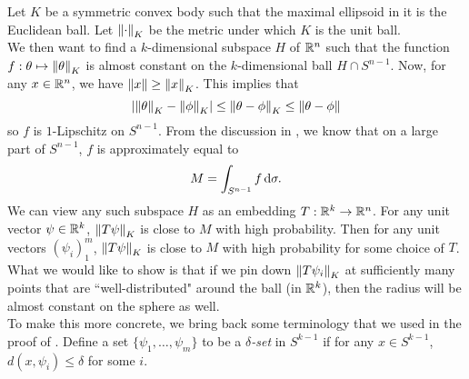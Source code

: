 Let $K$ be a symmetric convex body such that the maximal ellipsoid in it is the Euclidean ball. Let $\left\lVert\cdot\right\rVert_K$ be the metric under which $K$ is the unit ball.\\
We then want to find a $k$-dimensional subspace $H$ of $\mathbb{R}^n$ such that the function $f:\theta\mapsto\left\lVert\theta\right\rVert_K$ is almost constant on the $k$-dimensional ball $H\cap S^{n-1}$. Now, for any $x\in\mathbb{R}^n$, we have $\left\lVert x\right\rVert\geq\left\lVert x\right\rVert_K$. This implies that
\[ \left| \left\lVert\theta\right\rVert_K-\left\lVert\phi\right\rVert_K \right| \leq \left\lVert\theta-\phi\right\rVert_K \leq \left\lVert\theta-\phi\right\rVert \]
so $f$ is $1$-Lipschitz on $S^{n-1}$. From the discussion in , we know that on a large part of $S^{n-1}$, $f$ is approximately equal to
\[ M = \int_{S^{n-1}} f\operatorname{d}\!{\sigma}. \]
We can view any such subspace $H$ as an embedding $T:\mathbb{R}^k\to\mathbb{R}^n$. For any unit vector $\psi\in\mathbb{R}^k$, $\left\lVert T\psi\right\rVert_K$ is close to $M$ with high probability. Then for any unit vectors $(\psi_i)_1^m$, $\left\lVert T\psi\right\rVert_K$ is close to $M$ with high probability for some choice of $T$. What we would like to show is that if we pin down $\left\lVert T\psi_i\right\rVert_K$ at sufficiently many points that are ``well-distributed" around the ball (in $\mathbb{R}^k$), then the radius will be almost constant on the sphere as well.\\
To make this more concrete, we bring back some terminology that we used in the proof of .
Define a set $\{\psi_1,\ldots,\psi_m\}$ to be a \textit{$\delta$-set} in $S^{k-1}$ if for any $x\in S^{k-1}$, $d(x,\psi_i)\leq\delta$ for some $i$.

